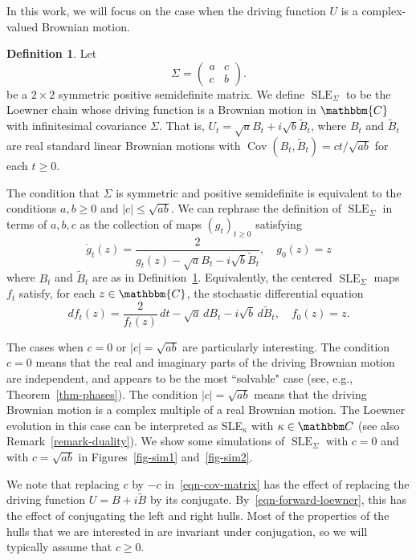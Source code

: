 \documentclass[11pt]{article}
\theoremstyle{plain}
\theoremstyle{definition}
\newtheorem{defn}[thm]{Definition}
\numberwithin{equation}{section}
\newcommand{\eqb}{\begin{equation}}
\newcommand{\eqe}{\end{equation}}
\newcommand{\BB}{\mathbbm}
\newcommand{\wt}{\widetilde}
\newcommand{\Cov}{\operatorname{Cov}}
\newcommand{\SLEG}{{\operatorname{SLE}}_\Sigma}
\begin{document}
In this work, we will focus on the case when the driving function $U$ is a complex-valued Brownian motion. 

\begin{defn}
\label{defn-sle}
Let
\eqb \label{eqn-cov-matrix}
\Sigma = \begin{pmatrix} a&c\\c&b\end{pmatrix} .
\eqe
be a $2 \times 2$ symmetric positive semidefinite matrix. We define $\SLEG$ to be the Loewner chain whose driving function is a Brownian motion in $\BB{C}$ with infinitesimal covariance $\Sigma$. That is, $U_t = \sqrt a B_t + i \sqrt b \wt B_t$, where $B_t$ and $\wt B_t$ are real standard linear Brownian motions with $\Cov(B_t,\wt B_t) = ct/\sqrt{ab}$ for each $t\geq 0$. 
\end{defn}
 
The condition that $\Sigma$ is symmetric and positive semidefinite is equivalent to the conditions $a,b \geq 0$ and $|c| \leq \sqrt{ab}$.  We can rephrase the definition of $\SLEG$ in terms of $a,b,c$ as the collection of maps $(g_t)_{t \geq 0}$ satisfying
\eqb
\label{eqn-def-gt}
\dot g_t(z) = \frac{2}{g_t(z) - \sqrt{a} B_t - i \sqrt{b} \wt B_t}, \quad g_0(z) = z
\eqe
where $B_t$ and $\wt B_t$ are as in Definition~\ref{defn-sle}.  Equivalently, the centered $\SLEG$ maps $f_t$ satisfy, for each $z \in \BB{C}$, the stochastic differential equation
\begin{equation}
df_t(z) = \frac{2}{f_t(z)}\, dt  - \sqrt{a}\, d B_t - i \sqrt{b}\, d\wt B_t ,\quad f_0(z) = z .
\label{eqn-def-ft}
\end{equation}

The cases when $c = 0$ or $|c| =\sqrt{ab}$ are particularly interesting. The condition $c=0$ means that the real and imaginary parts of the driving Brownian motion are independent, and appears to be the most ``solvable" case (see, e.g., Theorem~\ref{thm-phases}). The condition $|c| = \sqrt{ab}$ means that the driving Brownian motion is a complex multiple of a real Brownian motion. The Loewner evolution in this case can be interpreted as SLE$_\kappa$ with $\kappa\in\BB C$ (see also Remark~\ref{remark-duality}). We show some simulations of $\SLEG$ with $c=0$ and with $c=\sqrt{ab}$ in Figures~\ref{fig-sim1} and~\ref{fig-sim2}. 

We note that replacing $c$ by $-c$ in~\eqref{eqn-cov-matrix} has the effect of replacing the driving function $U = B + i\wt B$ by its conjugate. By~\eqref{eqn-forward-loewner}, this has the effect of conjugating the left and right hulls. Most of the properties of the hulls that we are interested in are invariant under conjugation, so we will typically assume that $c\geq 0$. 
\end{document}
